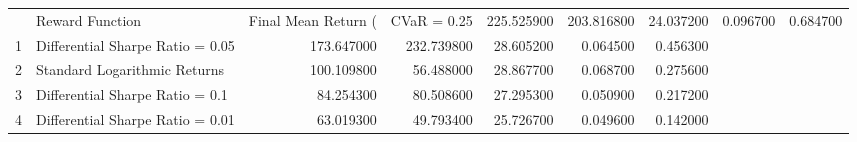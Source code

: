 \begin{tabular}{llrrrrr}
\toprule
 & Reward Function & Final Mean Return (%
 & CVaR = 0.25 & 225.525900 & 203.816800 & 24.037200 & 0.096700 & 0.684700 \\
1 & Differential Sharpe Ratio = 0.05 & 173.647000 & 232.739800 & 28.605200 & 0.064500 & 0.456300 \\
2 & Standard Logarithmic Returns & 100.109800 & 56.488000 & 28.867700 & 0.068700 & 0.275600 \\
3 & Differential Sharpe Ratio = 0.1 & 84.254300 & 80.508600 & 27.295300 & 0.050900 & 0.217200 \\
4 & Differential Sharpe Ratio = 0.01 & 63.019300 & 49.793400 & 25.726700 & 0.049600 & 0.142000 \\
\bottomrule
\end{tabular}
